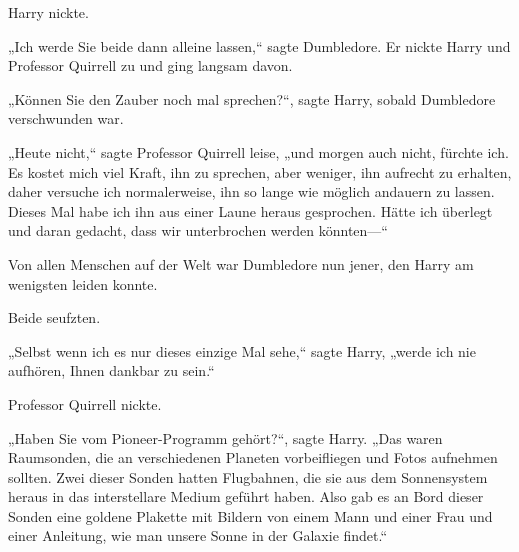 Harry nickte.

„Ich werde Sie beide dann alleine lassen,“ sagte Dumbledore. Er nickte Harry und Professor Quirrell zu und ging langsam davon.

„Können Sie den Zauber noch mal sprechen?“, sagte Harry, sobald Dumbledore verschwunden war.

„Heute nicht,“ sagte Professor Quirrell leise, „und morgen auch nicht, fürchte ich. Es kostet mich viel Kraft, ihn zu sprechen, aber weniger, ihn aufrecht zu erhalten, daher versuche ich normalerweise, ihn so lange wie möglich andauern zu lassen. Dieses Mal habe ich ihn aus einer Laune heraus gesprochen. Hätte ich überlegt und daran gedacht, dass wir unterbrochen werden könnten—“

Von allen Menschen auf der Welt war Dumbledore nun jener, den Harry am wenigsten leiden konnte.

Beide seufzten.

„Selbst wenn ich es nur dieses einzige Mal sehe,“ sagte Harry, „werde ich nie aufhören, Ihnen dankbar zu sein.“

Professor Quirrell nickte.

„Haben Sie vom Pioneer-Programm gehört?“, sagte Harry. „Das waren Raumsonden, die an verschiedenen Planeten vorbeifliegen und Fotos aufnehmen sollten. Zwei dieser Sonden hatten Flugbahnen, die sie aus dem Sonnensystem heraus in das interstellare Medium geführt haben. Also gab es an Bord dieser Sonden eine goldene Plakette mit Bildern von einem Mann und einer Frau und einer Anleitung, wie man unsere Sonne in der Galaxie findet.“

